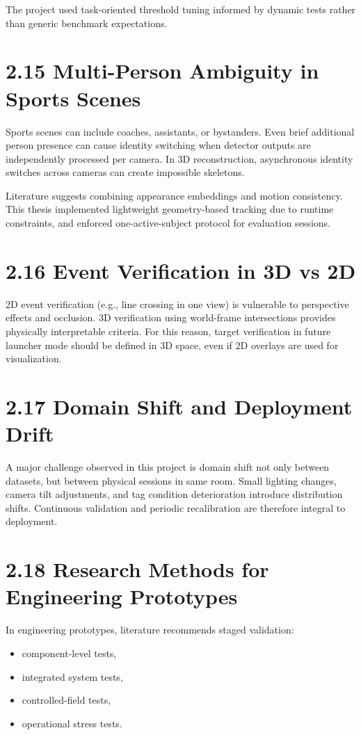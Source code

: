 The project used task-oriented threshold tuning informed by dynamic tests rather than generic benchmark expectations.

\section{2.15 Multi-Person Ambiguity in Sports Scenes}
Sports scenes can include coaches, assistants, or bystanders. Even brief additional person presence can cause identity switching when detector outputs are independently processed per camera. In 3D reconstruction, asynchronous identity switches across cameras can create impossible skeletons.

Literature suggests combining appearance embeddings and motion consistency. This thesis implemented lightweight geometry-based tracking due to runtime constraints, and enforced one-active-subject protocol for evaluation sessions.

\section{2.16 Event Verification in 3D vs 2D}
2D event verification (e.g., line crossing in one view) is vulnerable to perspective effects and occlusion. 3D verification using world-frame intersections provides physically interpretable criteria. For this reason, target verification in future launcher mode should be defined in 3D space, even if 2D overlays are used for visualization.

\section{2.17 Domain Shift and Deployment Drift}
A major challenge observed in this project is domain shift not only between datasets, but between physical sessions in same room. Small lighting changes, camera tilt adjustments, and tag condition deterioration introduce distribution shifts. Continuous validation and periodic recalibration are therefore integral to deployment.

\section{2.18 Research Methods for Engineering Prototypes}
In engineering prototypes, literature recommends staged validation:
\begin{itemize}
  \item component-level tests,
  \item integrated system tests,
  \item controlled-field tests,
  \item operational stress tests.
\end{itemize}

